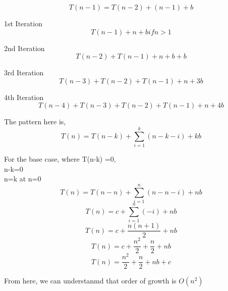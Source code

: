 \documentclass[11pt]{article}
\theoremstyle{definition}
\begin{document}
\begin{enumerate}
    \[ T(n-1) = T(n-2) + (n-1) + b \]

    1st Iteration
    \[ T(n-1) + n + b if n>1\]

    2nd Iteration
    \[ T(n-2)+T(n-1) + n + b + b \]

    3rd Iteration
    \[ T(n-3)+T(n-2)+T(n-1) + n + 3b\]

    4th Iteration
    \[ T(n-4)+T(n-3)+T(n-2)+T(n-1) + n + 4b\]

    The pattern here is,
    \[ T(n) = T(n-k) + \sum_{i=1}^{k} (n-k-i) +kb \]

    For the base case, where T(n-k) =0,\\
    n-k=0\\
    n=k at n=0\\

    \[ T(n) = T(n-n) + \sum_{i=1}^{n} (n-n-i) + nb \]
    \[ T(n) = c + \sum_{i=1}^{n} (-i) + nb \]
    \[ T(n) = c + \frac{n(n+1)}{2} + nb \]
    \[ T(n) = c + \frac{n^2}{2} + \frac{n}{2} + nb \]
    \[ T(n) = \frac{n^2}{2} + \frac{n}{2} + nb + c \]

    From here, we can understanmd that order of growth is $O(n^2)$

\end{enumerate}
\end{document}
